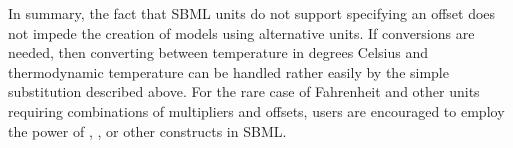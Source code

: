 In summary, the fact that SBML units do not support specifying an
offset does not impede the creation of models using alternative
units.  If conversions are needed, then converting between
temperature in degrees Celsius and thermodynamic temperature can
be handled rather easily by the simple substitution described
above.  For the rare case of Fahrenheit and other units requiring
combinations of multipliers and offsets, users are encouraged to
employ the power of \FunctionDefinition, \AssignmentRule, or other
constructs in SBML.





